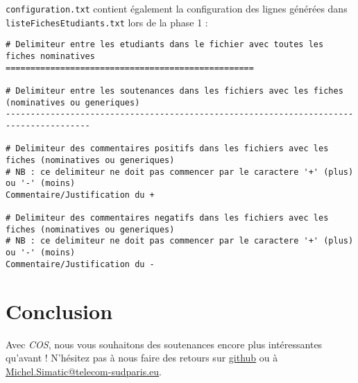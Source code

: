 \documentclass[11pt]{article}
\begin{document}
\verb~configuration.txt~ contient également la configuration des lignes
générées dans \verb~listeFichesEtudiants.txt~ lors de la phase 1 :
\begin{verbatim}
# Delimiteur entre les etudiants dans le fichier avec toutes les fiches nominatives
==================================================

# Delimiteur entre les soutenances dans les fichiers avec les fiches (nominatives ou generiques)
---------------------------------------------------------------------------------------

# Delimiteur des commentaires positifs dans les fichiers avec les fiches (nominatives ou generiques)
# NB : ce delimiteur ne doit pas commencer par le caractere '+' (plus) ou '-' (moins)
Commentaire/Justification du +

# Delimiteur des commentaires negatifs dans les fichiers avec les fiches (nominatives ou generiques)
# NB : ce delimiteur ne doit pas commencer par le caractere '+' (plus) ou '-' (moins)
Commentaire/Justification du -
\end{verbatim}
\section{Conclusion}
\label{sec-8}
Avec \emph{COS}, nous vous souhaitons des soutenances encore plus
intéressantes qu'avant ! N'hésitez pas à nous faire des retours sur
 \href{https://github.com/simatic/COS}{github} ou à \href{mailto:Michel.Simatic@telecom-sudparis.eu}{Michel.Simatic@telecom-sudparis.eu}.
\end{document}
